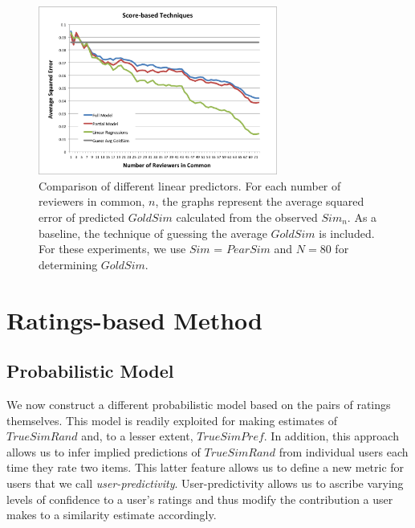 \documentclass[11pt]{article}
\begin{document}
\begin{figure}[!htbp]
    \centering
    \includegraphics[width=0.7\textwidth]{LinearTechniques.png}
	\caption{Comparison of different linear predictors. For each number of
reviewers in common, $n$, the graphs represent the average squared error of
predicted $GoldSim$ calculated from the observed $Sim_n$. As a baseline, the
technique of guessing the average $GoldSim$ is included. For these experiments,
we use $Sim$ = $PearSim$ and $N=80$ for determining $GoldSim$.}
    \label{fig:Linear}
\end{figure}


\section*{Ratings-based Method}
\subsection*{Probabilistic Model}

We now construct a different probabilistic model based on the pairs of ratings
themselves. This model is readily exploited for making estimates of
$TrueSimRand$ and, to a lesser extent, $TrueSimPref$. In addition, this approach
allows us to infer implied predictions of $TrueSimRand$ from individual users 
each time they rate two items. This latter feature allows us to define a new 
metric for users that we call {\em user-predictivity}. User-predictivity allows
us to ascribe varying levels of confidence to a user's ratings and thus modify
the contribution a user makes to a similarity estimate accordingly.
\end{document}
